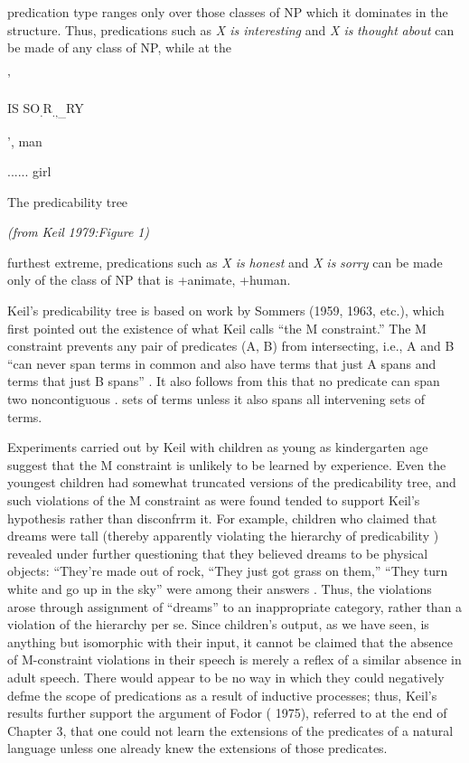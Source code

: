 predication type ranges only over those classes of NP which it domi\-nates in the structure. Thus, predications such as \textit{X is interesting} and \textit{X is} \textit{thought} \textit{about} can be made of any class of NP, while at the

'

IS SO\textsubscript{.}R\textsubscript{.,}\textsubscript{\_}RY

', man 

...... girl

The predicability tree

\textit{(from} \textit{Keil} \textit{1979:Figure} \textit{1)}


furthest extreme, predications such as \textit{X is} \textit{honest} and \textit{X} \textit{is} \textit{sorry} can be made only of the class of NP that is +animate, +human.

Keil's predicability tree is based on work by Sommers (1959, 1963, etc.), which first pointed out the existence of what Keil calls ``the M constraint.'' The M constraint prevents any pair of predicates (A, B) from intersecting, i.e., A and B ``can never span terms in com\-mon and also have terms that just A spans and terms that just B spans'' \citep[16]{Keil1979}. It also follows from this that no predicate can span two noncontiguous . sets of terms unless it also spans all intervening sets of terms.

Experiments carried out by Keil with children as young as kindergarten age suggest that the M constraint is unlikely to be learned by experience. Even the youngest children had somewhat truncated versions of the predicability tree, and such violations of the M con\-straint as were found tended to support Keil's hypothesis rather than disconfrrm it. For example, children who claimed that dreams were tall (thereby apparently violating the hierarchy of predicability ) re\-vealed under further questioning that they believed dreams to be physical objects: ``They're made out of rock,{\textquotedbl} ``They just got grass on them,'' ``They turn white and go up in the sky'' were among their answers \citep[110]{Keil1979}. Thus, the violations arose through assignment of ``dreams'' to an inappropriate category, rather than a violation of the hierarchy per se. Since children's output, as we have seen, is any\-thing but isomorphic with their input, it cannot be claimed that the absence of M-constraint violations in their speech is merely a reflex of a similar absence in adult speech. There would appear to be no way in which they could negatively defme the scope of predications as a result of inductive processes; thus, Keil's results further support the argument of Fodor ( 1975), referred to at the end of Chapter 3, that one could not learn the extensions of the predicates of a natural lan\-guage unless one already knew the extensions of those predicates.

